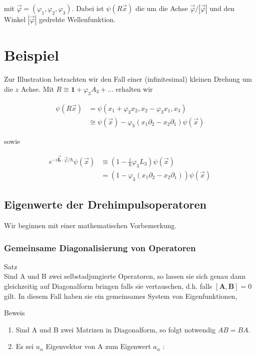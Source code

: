 \documentclass[10pt, letterpaper]{article}
\begin{document}
mit $\vec{\varphi}=\left(\varphi_{1}, \varphi_{2}, \varphi_{3}\right)$. Dabei ist $\psi(R \vec{x})$ die um die Achse $\vec{\varphi} /|\vec{\varphi}|$ und den Winkel $|\vec{\varphi}|$ gedrehte Wellenfunktion.

\section*{Beispiel}
Zur Illustration betrachten wir den Fall einer (infinitesimal) kleinen Drehung um die $z$ Achse. Mit $R \cong \mathbf{1}+\varphi_{3} A_{3}+\ldots$ erhalten wir

$$
\begin{aligned}
\psi(R \vec{x}) & =\psi\left(x_{1}+\varphi_{3} x_{2}, x_{2}-\varphi_{3} x_{1}, x_{3}\right) \\
& \cong \psi(\vec{x})-\varphi_{3}\left(x_{1} \partial_{2}-x_{2} \partial_{1}\right) \psi(\vec{x})
\end{aligned}
$$

sowie

$$
\begin{aligned}
e^{-i \overrightarrow{\mathbf{L}} \cdot \vec{\varphi} / \hbar} \psi(\vec{x}) & \cong\left(1-\frac{i}{\hbar} \varphi_{3} L_{3}\right) \psi(\vec{x}) \\
& =\left(1-\varphi_{3}\left(x_{1} \partial_{2}-x_{2} \partial_{1}\right)\right) \psi(\vec{x})
\end{aligned}
$$

\subsection*{Eigenwerte der Drehimpulsoperatoren}
Wir beginnen mit einer mathematischen Vorbemerkung.

\subsubsection*{Gemeinsame Diagonalisierung von Operatoren}
Satz\\
Sind A und B zwei selbstadjungierte Operatoren, so lassen sie sich genau dann gleichzeitig auf Diagonalform bringen falls sie vertauschen, d.h. falls $[\mathbf{A}, \mathbf{B}]=0$ gilt. In diesem Fall haben sie ein gemeinsames System von Eigenfunktionen,

Beweis

\begin{enumerate}
  \item Sind A und B zwei Matrizen in Diagonalform, so folgt notwendig $A B=B A$.
  \item Es sei $u_{\alpha}$ Eigenvektor von A zum Eigenwert $a_{\alpha}$ :
\end{enumerate}
\end{document}
